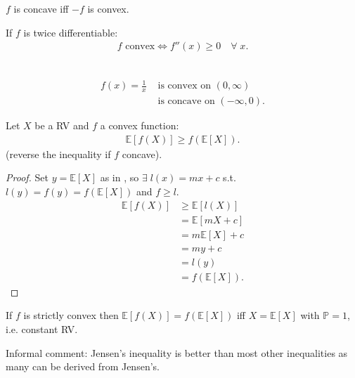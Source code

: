 \begin{definition}
    $f$ is concave iff $-f$ is convex.
\end{definition} 

\begin{claim}
    If $f$ is twice differentiable:
    \begin{align*}
        f \text{ convex} \iff f''(x) \geq 0 \quad \forall \; x.
    \end{align*} 
\end{claim} 

\begin{example} ~\vspace*{-1.5\baselineskip}
    \begin{align*}
        f(x) = \frac{1}{x} &\text{ is convex on } (0, \infty) \\
        &\text{ is concave on } (-\infty, 0).
    \end{align*} 
\end{example} 

\begin{theorem} \label{thm:jensen}
    Let $X$ be a RV and $f$ a convex function:
    \begin{align*}
        \mathbb{E}[f(X)] \geq f(\mathbb{E}[X]).
    \end{align*} 
    (reverse the inequality if $f$ concave).
\end{theorem} 

\begin{proof}
    Set $y = \mathbb{E}[X]$ as in , so $\exists \; l(x) = mx + c$ s.t. $l(y) = f(y) = f(\mathbb{E}[X])$ and $f \geq l$.
    \begin{align*}
        \mathbb{E}[f(X)] &\geq \mathbb{E}[l(X)] \\
        &= \mathbb{E}[mX + c] \\
        &= m \mathbb{E}[X] + c \\
        &= my + c \\
        &= l(y) \\
        &= f(\mathbb{E}[X]).
    \end{align*} 
\end{proof} 

\begin{claim}
    If $f$ is strictly convex then $\mathbb{E}[f(X)] = f(\mathbb{E}[X])$ iff $X = \mathbb{E}[X]$ with $\mathbb{P} = 1$, i.e. constant RV.
\end{claim} 

Informal comment: Jensen's inequality is better than most other inequalities as many can be derived from Jensen's.

